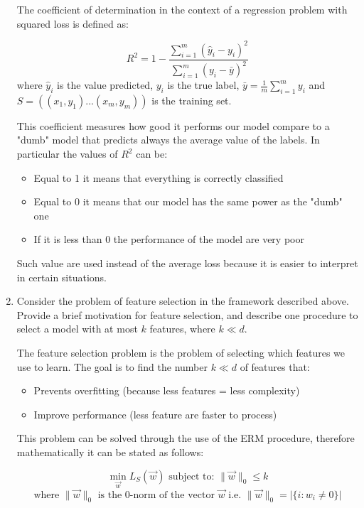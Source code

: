 \documentclass[a4paper,11pt,oneside]{book}
\begin{document}
\begin{enumerate}
\begin{solution}
    The coefficient of determination in the context of a regression problem with squared loss is defined as:
    
    $$R^2 = 1 - \frac{\sum_{i=1}^m(\hat{y}_i-y_i)^2}{\sum_{i=1}^m(y_i-\bar{y})^2}$$ 
    where $\hat{y}_i$ is the value predicted, $y_i$ is the true label, $\bar{y} = \frac{1}{m}\sum_{i=1}^m y_i$ and $S = ((x_1, y_1) ... (x_m, y_m))$ is the training set.
    
    This coefficient measures how good it performs our model compare to a "dumb" model that predicts always the average value of the labels. In particular the values of $R^2$ can be:
    
    \begin{itemize}
    \item Equal to 1 it means that everything is correctly classified
    \item Equal to 0 it means that our model has the same power as the "dumb" one
    \item If it is less than 0 the performance of the model are very poor
    \end{itemize}
    
    Such value are used instead of the average loss because it is easier to interpret in certain situations.
\end{solution}

\clearpage 
\item Consider the problem of feature selection in the framework described above. Provide a brief motivation for feature selection, and describe one procedure to select a model with at most $k$ features, where $k \ll d$.
\begin{solution}
    The feature selection problem is the problem of selecting which features we use to learn. The goal is to find the number $k \ll d$ of features that:
    
    \begin{itemize}
    \item Prevents overfitting (because less features = less complexity)
    \item Improve performance (less feature are faster to process)
    \end{itemize}
    
    This problem can be solved through the use of the ERM procedure, therefore mathematically it can be stated as follows:
    
    $$\min_{\vec{w}}L_S(\vec{w}) \text{ subject to: } \|\vec{w}\|_0 \leq k$$
    $$\text{where } \|\vec{w}\|_0 \text{ is the 0-norm of the vector } \vec{w} \text{ i.e. } \|\vec{w}\|_0 = |\{i : w_i \neq 0\}|$$


\end{solution}
\end{enumerate}
\end{document}

